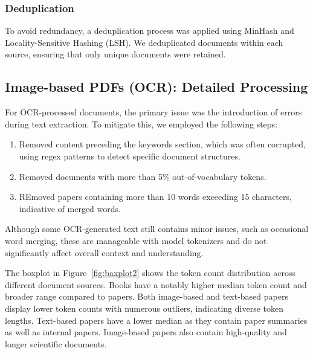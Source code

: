 \subsubsection{Deduplication}
To avoid redundancy, a deduplication process was applied using MinHash and Locality-Sensitive Hashing (LSH). We deduplicated documents within each source, ensuring that only unique documents were retained.

\subsection{Image-based PDFs (OCR): Detailed Processing}
For OCR-processed documents, the primary issue was the introduction of errors during text extraction. To mitigate this, we employed the following steps:
\begin{enumerate}
    \item Removed content preceding the keywords section, which was often corrupted, using regex patterns to detect specific document structures.
    \item Removed documents with more than 5\% out-of-vocabulary tokens.
    \item REmoved papers containing more than 10 words exceeding 15 characters, indicative of merged words.
\end{enumerate}
Although some OCR-generated text still contains minor issues, such as occasional word merging, these are manageable with model tokenizers and do not significantly affect overall context and understanding.

The boxplot in Figure~\ref{fig:baxplot2} shows the token count distribution across different document sources. Books have a notably higher median token count and broader range compared to papers. Both image-based and text-based papers display lower token counts with numerous outliers, indicating diverse token lengths. Text-based papers have a lower median as they contain paper summaries as well as internal papers. Image-based papers also contain high-quality and longer scientific documents. 